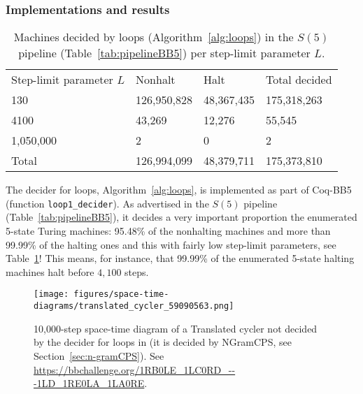 \subsubsection{Implementations and results}\label{sec:loops:results}

\begin{table}[h!]
  \centering
  \begin{tabular}{llll}
    Step-limit parameter $L$ & Nonhalt                         & Halt                           & Total decided \\
    130                      & 126,950,828                     & 48,367,435                     & 175,318,263   \\
    4100                     & 43,269                          & 12,276                         & 55,545        \\
    1,050,000                & 2                               & 0                              & 2             \\ \hline
    Total                    & \multicolumn{1}{r}{126,994,099} & \multicolumn{1}{r}{48,379,711} & 175,373,810
  \end{tabular}
  \caption{Machines decided by loops (Algorithm~\ref{alg:loops}) in the $S(5)$ pipeline (Table~\ref{tab:pipelineBB5}) per step-limit parameter $L$.}\label{tab:paramsLoops}
\end{table}

The decider for loops, Algorithm~\ref{alg:loops}, is implemented as part of Coq-BB5 (function \texttt{loop1\_decider}). As advertised in the $S(5)$ pipeline (Table~\ref{tab:pipelineBB5}), it decides a very important proportion the enumerated 5-state Turing machines: 95.48\% of the nonhalting machines and more than 99.99\% of the halting ones and this with fairly low step-limit parameters, see Table~\ref{tab:paramsLoops}! This means, for instance, that 99.99\% of the enumerated 5-state halting machines halt before $4,100$ steps.

\begin{figure}
  \centering
  \texttt{[image: figures/space-time-diagrams/translated\_cycler\_59090563.png]}

  \caption{10,000-step space-time diagram of a Translated cycler not decided by the decider for loops in \CoqBB (it is decided by NGramCPS, see Section~\ref{sec:n-gramCPS}). See \url{https://bbchallenge.org/1RB0LE_1LC0RD_---1LD_1RE0LA_1LA0RE}.}\label{fig:translated-cyclers-more}
\end{figure}



